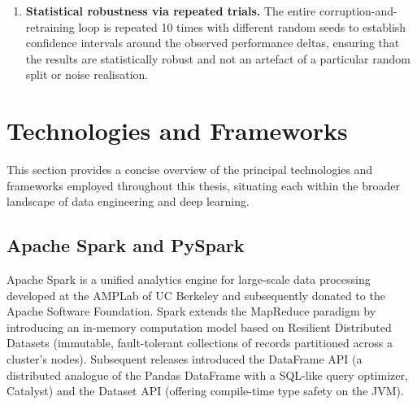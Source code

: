\documentclass[../main.tex]{subfiles}
\begin{document}
\begin{enumerate}
          Retaining same dataset as previous, Each of the five target features is then corrupted independently using four of PuckTrick's five corruption methods (missing, noise, outliers,
          labels), yielding $5 \times 4 = 20$ corrupted dataset variants.  The
          fifth method, \emph{duplicated}, is row-level and therefore applied
          once globally on an arbitrary feature.  Each variant is used to
          retrain both TabNet and TFT, producing a total of
          $(5 \times 4 + 1) \times 2 = 42$ model evaluations.
    \item \textbf{Statistical robustness via repeated trials.}
          The entire corruption-and-retraining loop is repeated 10 times with
          different random seeds to establish confidence intervals around the
          observed performance deltas, ensuring that the results are
          statistically robust and not an artefact of a particular random
          split or noise realisation.
\end{enumerate}

\newpage
\section{Technologies and Frameworks}
\label{sec:technologies}

This section provides a concise overview of the principal technologies and frameworks employed throughout this thesis, situating each within the broader landscape of data engineering and deep learning.

\subsection{Apache Spark and PySpark}
\label{sec:tech-spark}

Apache Spark is a unified analytics engine for large-scale data processing developed at the AMPLab of UC Berkeley and subsequently donated to the Apache Software Foundation.  Spark extends the MapReduce paradigm by introducing an in-memory computation model based on Resilient Distributed Datasets (immutable, fault-tolerant collections of records partitioned across a cluster's nodes).  Subsequent releases introduced the DataFrame API (a distributed analogue of the Pandas DataFrame with a SQL-like query optimizer, Catalyst) and the Dataset API (offering compile-time type safety on the JVM).
\end{document}
